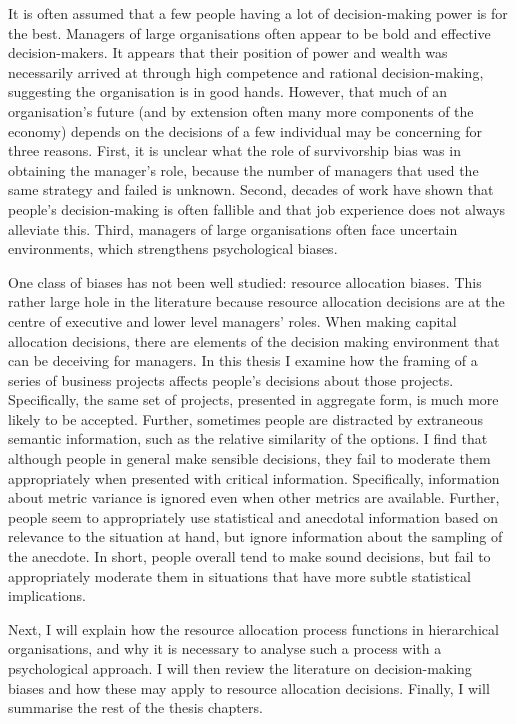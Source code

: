 \documentclass[a4paper, nobind, dvipsnames]{templates/ociamthesis}
\theoremstyle{definition}
\theoremstyle{definition}
\theoremstyle{definition}
\theoremstyle{definition}
\theoremstyle{remark}
\begin{document}
It is often assumed that a few people having a lot of decision-making power is
for the best. Managers of large organisations often appear to be bold and
effective decision-makers. It appears that their position of power and wealth
was necessarily arrived at through high competence and rational decision-making,
suggesting the organisation is in good hands. However, that much of an
organisation's future (and by extension often many more components of the
economy) depends on the decisions of a few individual may be concerning for
three reasons. First, it is unclear what the role of survivorship bias was in
obtaining the manager's role, because the number of managers that used the same
strategy and failed is unknown. Second, decades of work have shown that people's
decision-making is often fallible and that job experience does not always
alleviate this. Third, managers of large organisations often face uncertain
environments, which strengthens psychological biases.

One class of biases has not been well studied: resource allocation biases. This
rather large hole in the literature because resource allocation decisions are at
the centre of executive and lower level managers' roles. When making capital
allocation decisions, there are elements of the decision making environment that
can be deceiving for managers. In this thesis I examine how the framing of a
series of business projects affects people's decisions about those projects.
Specifically, the same set of projects, presented in aggregate form, is much
more likely to be accepted. Further, sometimes people are distracted by
extraneous semantic information, such as the relative similarity of the options.
I find that although people in general make sensible decisions, they fail to
moderate them appropriately when presented with critical information.
Specifically, information about metric variance is ignored even when other
metrics are available. Further, people seem to appropriately use statistical and
anecdotal information based on relevance to the situation at hand, but ignore
information about the sampling of the anecdote. In short, people overall tend to
make sound decisions, but fail to appropriately moderate them in situations that
have more subtle statistical implications.

Next, I will explain how the resource allocation process functions in
hierarchical organisations, and why it is necessary to analyse such a process
with a psychological approach. I will then review the literature on
decision-making biases and how these may apply to resource allocation decisions.
Finally, I will summarise the rest of the thesis chapters.
\end{document}

